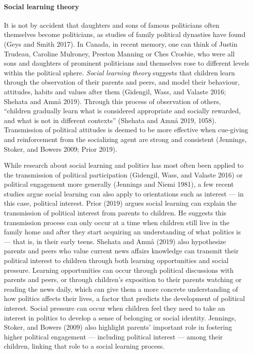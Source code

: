 \documentclass[
  letterpaper,
  DIV=11,
  numbers=noendperiod]{scrreprt}
\let\oldparagraph\paragraph
\renewcommand{\paragraph}[1]{\oldparagraph{#1}\mbox{}}
\begin{document}
\paragraph{Social learning theory}\label{social-learning-theory}

It is not by accident that daughters and sons of famous politicians
often themselves become politicians, as studies of family political
dynasties have found (Geys and Smith 2017). In Canada, in recent memory,
one can think of Justin Trudeau, Caroline Mulroney, Preston Manning or
Ches Crosbie, who were all sons and daughters of prominent politicians
and themselves rose to different levels within the political sphere.
\emph{Social learning theory} suggests that children learn through the
observation of their parents and peers, and model their behaviour,
attitudes, habits and values after them (Gidengil, Wass, and Valaste
2016; Shehata and Amnå 2019). Through this process of observation of
others, ``children gradually learn what is considered appropriate and
socially rewarded, and what is not in different contexts'' (Shehata and
Amnå 2019, 1058). Transmission of political attitudes is deemed to be
more effective when cue-giving and reinforcement from the socializing
agent are strong and consistent (Jennings, Stoker, and Bowers 2009;
Prior 2019).

While research about social learning and politics has most often been
applied to the transmission of political participation (Gidengil, Wass,
and Valaste 2016) or political engagement more generally (Jennings and
Niemi 1981), a few recent studies argue social learning can also apply
to orientations such as interest --- in this case, political interest.
Prior (2019) argues social learning can explain the transmission of
political interest from parents to children. He suggests this
transmission process can only occur at a time when children still live
in the family home and after they start acquiring an understanding of
what politics is --- that is, in their early teens. Shehata and Amnå
(2019) also hypothesize parents and peers who value current news affairs
knowledge can transmit their political interest to children through both
learning opportunities and social pressure. Learning opportunities can
occur through political discussions with parents and peers, or through
children's exposition to their parents watching or reading the news
daily, which can give them a more concrete understanding of how politics
affects their lives, a factor that predicts the development of political
interest. Social pressure can occur when children feel they need to take
an interest in politics to develop a sense of belonging or social
identity. Jennings, Stoker, and Bowers (2009) also highlight parents'
important role in fostering higher political engagement --- including
political interest --- among their children, linking that role to a
social learning process.
\end{document}
